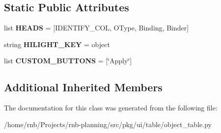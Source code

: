 \subsection*{Static Public Attributes}
\begin{DoxyCompactItemize}
\item 
\mbox{\label{classrnb-planning_1_1src_1_1pkg_1_1ui_1_1table_1_1object__table_1_1_object_table_a1d3fad3c12ecc105b708805c2a6e2e1c}} 
list {\bfseries H\+E\+A\+DS} = \mbox{[}I\+D\+E\+N\+T\+I\+F\+Y\+\_\+\+C\+OL, \textquotesingle{}O\+Type\textquotesingle{}, \textquotesingle{}Binding\textquotesingle{}, \textquotesingle{}Binder\textquotesingle{}\mbox{]}
\item 
\mbox{\label{classrnb-planning_1_1src_1_1pkg_1_1ui_1_1table_1_1object__table_1_1_object_table_a12499e47cfd2a84fb08a136e153548a9}} 
string {\bfseries H\+I\+L\+I\+G\+H\+T\+\_\+\+K\+EY} = \textquotesingle{}object\textquotesingle{}
\item 
\mbox{\label{classrnb-planning_1_1src_1_1pkg_1_1ui_1_1table_1_1object__table_1_1_object_table_a6aaa5b312d33c3107bab0bc08ccd98c0}} 
list {\bfseries C\+U\+S\+T\+O\+M\+\_\+\+B\+U\+T\+T\+O\+NS} = \mbox{[}\char`\"{}Apply\char`\"{}\mbox{]}
\end{DoxyCompactItemize}
\subsection*{Additional Inherited Members}


The documentation for this class was generated from the following file\+:\begin{DoxyCompactItemize}
\item 
/home/rnb/\+Projects/rnb-\/planning/src/pkg/ui/table/object\+\_\+table.\+py\end{DoxyCompactItemize}
